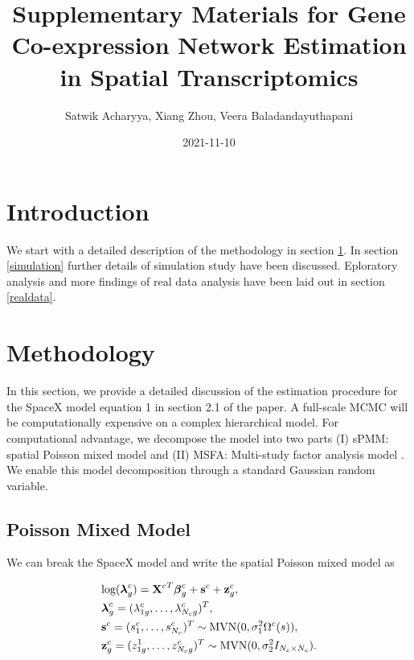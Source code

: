 \documentclass[
]{book}
\title{Supplementary Materials for Gene Co-expression Network Estimation in Spatial Transcriptomics}
\author{Satwik Acharyya, Xiang Zhou, Veera Baladandayuthapani}
\date{2021-11-10}
\begin{document}
\maketitle

{
\setcounter{tocdepth}{1}
\tableofcontents
}
\hypertarget{appendix-supplementary-materials}{%
\appendix}


\hypertarget{introduction}{%
\chapter*{Introduction}\label{introduction}}

We start with a detailed description of the methodology in section \ref{method}. In section \ref{simulation} further details of simulation study have been discussed. Eploratory analysis and more findings of real data analysis have been laid out in section \ref{realdata}.

\hypertarget{method}{%
\chapter{Methodology}\label{method}}

In this section, we provide a detailed discussion of the estimation procedure for the SpaceX model equation 1 in section 2.1 of the paper. A full-scale MCMC will be computationally expensive on a complex hierarchical model. For computational advantage, we decompose the model into two parts (I) sPMM: spatial Poisson mixed model \citep{sun2017differential} and (II) MSFA: Multi-study factor analysis model \citep{de2018bayesian}. We enable this model decomposition through a standard Gaussian random variable.

\hypertarget{poisson-mixed-model}{%
\section{Poisson Mixed Model}\label{poisson-mixed-model}}

We can break the SpaceX model and write the spatial Poisson mixed model as

\begin{align}
\begin{split}
& \text{log}({\boldsymbol \lambda}^{c}_{g}) = {{\bf X}^{c}}^{T} {\boldsymbol \beta}^{c}_{g} + {\bf s}^{c} + {\bf z}^{c}_{g}, \\
& {\boldsymbol \lambda}^{c}_{g} = ( \lambda^{c}_{1g}, \dots , \lambda^{c}_{N_{c}g} )^{T}, \\
&{\bf s}^{c} = ( s^{c}_{1}, \dots , s^{c}_{N_{c}} )^{T} \sim \text{MVN}(0, \sigma_{1}^{2}\Omega^{c}(s)), \\
&{\bf z}^{c}_{g} = (z^{1}_{1g}, \dots , z^{c}_{N_{c}g})^{T} \sim \text{MVN}(0, \sigma_{2}^{2} I_{N_{c} \times N_{c} }).
\end{split}
\label{eq:PMM-supp}
\end{align}
\end{document}
